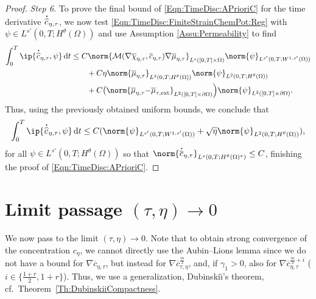 \documentclass[a4paper,12pt]{article}
\newcommand{\ext}{\mathrm{ext}}
\newcommand{\calM}{\mathcal{M}}
\newcommand{\pl}{\partial}
\newcommand{\dt}{\mathrm{\,d}t}
\newcommand{\chibar}{\overline{\chi}}
\newcommand{\mubar}{\overline{\mu}}
\newcommand{\cbar}{\overline{c}}
\newcommand{\chat}{\widehat{c}}
\newcommand\DT[1]{\mathchoice
                 {{\buildrel{\hspace*{.1em}\text{\LARGE.}}\over{#1}}}
                 {{\buildrel{\hspace*{.1em}\text{\Large.}}\over{#1}}}
                 {{\buildrel{\hspace*{.1em}\text{\large.}}\over{#1}}}
                 {{\buildrel{\hspace*{.1em}\text{\large.}}\over{#1}}}}
\renewcommand{\dot}{\DT}
\theoremstyle{plain}
\theoremstyle{definition}
\numberwithin{equation}{section}
\begin{document}
\begin{proof}
\emph{Step 6.} 
 To prove the final bound of \eqref{Eqn:TimeDisc:APrioriC} for the time derivative $\dot \chat_{\eta,\tau}$, we now test \eqref{Eqn:TimeDisc:FiniteStrainChemPot:Reg} with $\psi\in L^{s'}(0,T;H^\theta(\Omega))$ and use Assumption \ref{Assu:Permeability} to find
    \begin{align*}
	\int_0^T\ip{\dot \chat_{\eta,\tau},\psi}\dt 
    &\leq C\norm{\calM(\nabla\chibar_{\eta,\tau},\cbar_{\eta,\tau})\nabla\mubar_{\eta,\tau}}_{L^s([0,T]\times\Omega)}\norm{\psi}_{L^{s'}(0,T;W^{1,s'}(\Omega))} \\
    &\qquad  + 
    C\eta\norm{\mubar_{\eta,\tau}}_{L^2(0,T;H^\theta(\Omega))}\norm{\psi}_{L^2(0,T;H^\theta(\Omega))}\\
    &\qquad + C\big(\norm{\mubar_{\eta,\tau}{-}\mubar_{\tau,\ext}}_{L^2([0,T]\times\pl\Omega)}\Big) \norm{\psi}_{L^2([0,T]\times\pl\Omega)}.
 	\end{align*}	
	Thus, using the previously obtained uniform bounds, we conclude that
	\begin{equation}
	\label{Eqn:FiniteStrain:APrioriCdot}
	\int_0^T \ip{\dot \chat_{\eta,\tau},\psi}\dt \leq C(\norm{\psi}_{L^{s'}(0,T;W^{1,s'}(\Omega))} + \sqrt{\eta}\norm{\psi}_{L^2(0,T;H^\theta(\Omega))}),
	\end{equation}
   for all $\psi\in L^{s'}(0,T;H^{\theta}(\Omega))$ so that $\norm{\dot \cbar_{\eta,\tau}}_{L^{s}(0,T;H^\theta(\Omega)^*)}\leq C$, finishing the proof of \eqref{Eqn:TimeDisc:APrioriC}.
\end{proof}


%
%
%







  
%
%
%
%
%
%
%
%

%
%
%
%
%
%
%




  
		



	

	

		
%
%
%
%
%
%
%
%
%
%
%
%
%
%
%
%
%

\section{Limit passage \texorpdfstring{$(\tau,\eta)\to 0$}{Limit passage}}
\label{Sect:LimitPassage}

We now pass to the limit $(\tau,\eta)\to 0$. Note that to obtain strong convergence of the concentration $c_\eta$, we cannot directly use the Aubin--Lions lemma since we do not have a bound for $\nabla \cbar_{\eta,\tau}$, but instead for $\nabla \cbar_{\tau,\eta}^{\frac{m}{2}}$, and, if $\gamma_1>0$, also for $\nabla \cbar_{\eta,\tau}^{\frac{m}{2} + i}$ ($i\in \{\frac{1+r}{2}, 1{+}r\}$). Thus, we use a generalization, Dubinski\u\i's theorem, cf.\ Theorem~\ref{Th:DubinskiiCompactness}. 
\end{document}
